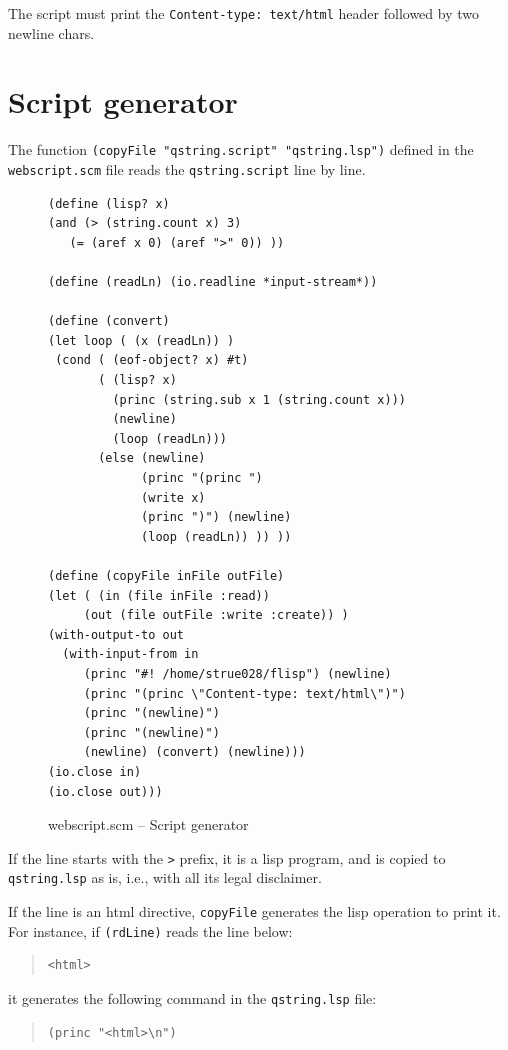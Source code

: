 \documentclass[a4paper,12pt]{book}
\begin{document}
The script must print the
\verb|Content-type: text/html| header
followed by two newline chars.

\section{Script generator}

The function \verb|(copyFile "qstring.script" "qstring.lsp")|
defined in the \verb|webscript.scm| file reads the
\verb|qstring.script| line by line.


\begin{figure}[!h]
\begin{verbatim}
(define (lisp? x)
(and (> (string.count x) 3)
   (= (aref x 0) (aref ">" 0)) ))

(define (readLn) (io.readline *input-stream*))

(define (convert)
(let loop ( (x (readLn)) )
 (cond ( (eof-object? x) #t)
       ( (lisp? x)
         (princ (string.sub x 1 (string.count x))) 
         (newline)
         (loop (readLn))) 
       (else (newline)
             (princ "(princ ")
             (write x)
             (princ ")") (newline)
             (loop (readLn)) )) ))

(define (copyFile inFile outFile)
(let ( (in (file inFile :read))
     (out (file outFile :write :create)) )
(with-output-to out
  (with-input-from in   
     (princ "#! /home/strue028/flisp") (newline)
     (princ "(princ \"Content-type: text/html\")")
     (princ "(newline)")
     (princ "(newline)")
     (newline) (convert) (newline)))
(io.close in)
(io.close out)))
\end{verbatim}
\caption{webscript.scm -- Script generator}
\label{lst:webscript.scm}
\end{figure}



If the line
starts with the \verb|>| prefix, it is a lisp
program, and is copied to \verb|qstring.lsp| as is,
i.e., with all its legal disclaimer.

If the line is an html directive, \verb|copyFile|
generates the lisp operation to print it. For instance,
if \verb|(rdLine)| reads the line below:
\begin{quote}
\begin{verbatim}
<html>
\end{verbatim}
\end{quote}
it generates the following command in the
\verb|qstring.lsp| file:
\begin{quote}
\begin{verbatim}
(princ "<html>\n")
\end{verbatim}
\end{quote}
\end{document}
